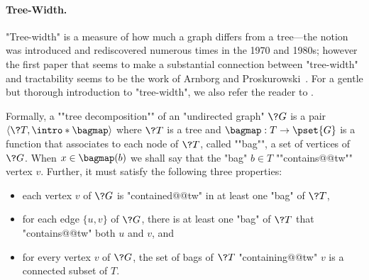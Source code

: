 \paragraph*{Tree-Width.}
\AP "Tree-width" is a measure of how much a
graph differs from a tree---the notion was introduced and rediscovered
numerous times in the 1970 and 1980s; however the first paper
that seems to make a substantial connection between "tree-width" and tractability
seems to be the work of Arnborg and Proskurowski~\cite{ArnborgProskurowski1989LinearTreewidth}.
For a gentle but thorough introduction to "tree-width", we also refer the reader to
\cite[\S~3.6]{NesetrilPOM2012Prolegomena}.

Formally, a \AP""tree decomposition"" of an "undirected graph" $\?G$ is a
pair $\tup{\?T, \intro*\bagmap}$ where $\?T$ is a tree and $\bagmap: T \to \pset{G}$ is a function that associates to each node of $\?T$, called \AP""bag"",
a set of vertices of $\?G$. When $x \in \bagmap(b)$ we shall say that the "bag"
$b \in T$ \AP""contains@@tw"" vertex $v$. Further, it must satisfy the following three properties:
\begin{itemize}
    \item each vertex $v$ of $\?G$ is "contained@@tw" in at least one "bag" of $\?T$,
    \item for each edge $\{u,v\}$ of $\?G$, there is at least one "bag" of $\?T$
        that "contains@@tw" both $u$ and $v$, and 
    \item for every vertex $v$ of $\?G$, the set of bags of $\?T$ "containing@@tw" $v$ is a 
        connected subset of $T$.
\end{itemize}

